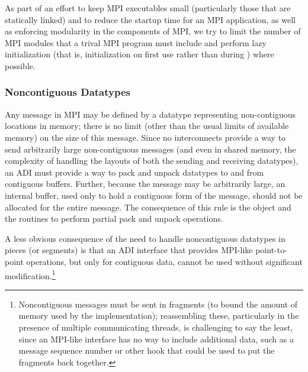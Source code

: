 \documentclass[dvipdfm]{article}
\begin{document}
As part of an effort to keep MPI executables small (particularly those
that are statically linked) and to reduce the
startup time for an MPI application, as well as enforcing modularity
in the components of MPI, we try to limit the number of MPI modules
that a trival MPI program must include and perform lazy initialization
(that is, initialization on first use rather than during
) where possible.

\subsubsection{Noncontiguous Datatypes}
Any message in MPI may be defined by a datatype representing
non-contiguous locations in memory; there is no limit (other than the
usual limits of available memory) on the size of this message.  Since
no interconnects provide a way to send arbitrarily large
non-contiguous messages (and even in shared memory, the complexity of
handling the layouts of both the sending and receiving datatypes), an
ADI must provide a way to pack and unpack datatypes to and from
contiguous buffers.  
Further, because the message may be arbitrarily large, an internal
buffer,
used only to hold a contiguous form of the message, should
not be allocated for the entire message.
The consequence of this rule is the  object and the
routines to perform partial pack and unpack operations.

A less obvious consequence of the need to handle noncontiguous
datatypes in pieces (or segments) is that an ADI interface that
provides MPI-like point-to-point operations, but only for contiguous
data, cannot be used without significant modification.\footnote{Noncontiguous
  messages must be sent in fragments (to bound the amount of memory
  used by the implementation); reassembling these, particularly in the
  presence of multiple communicating threads, is challenging to say the least,
  since an MPI-like interface has no way to include additional data, such as a
  message sequence number or other hook that could be used to put the
  fragments back together.}

\end{document}
